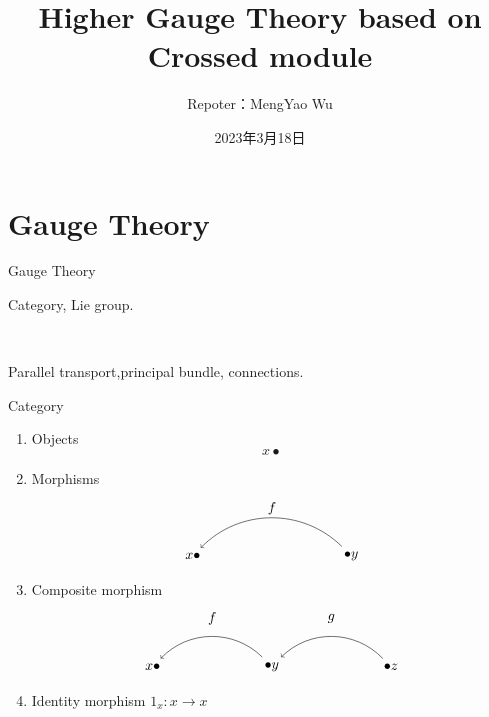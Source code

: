 \documentclass[12pt,aspectratio=53,mathserif]{beamer}
\title[Higher Gauge Theory based on Crossed module ]   %
       {\textbf{Higher Gauge Theory based on Crossed module} }   %
\author[Capital Normal University]    %
       {Repoter：MengYao Wu
       	\\[3mm]}
\date[2023年3月18日]{2023年3月18日}
\begin{document}
\begin{frame}
\titlepage
\end{frame}				%



	
%	
%	

	\section{Gauge Theory}
	
        
    
	\begin{frame}{Gauge Theory}
		\begin{itemize}
            \begin{spacing}{2.0}
			\item 
			Category, Lie group.
			
			\ 
			\item 
			 Parallel transport,principal bundle, connections.
		\end{spacing}
    	\end{itemize} 
  	\end{frame}

\begin{frame}{Category}
    	\begin{enumerate} 
        \item Objects
        $$x \bullet$$
        \item Morphisms
        $$\begin{tikzpicture}
            \node[black](a)at(0, 0){$x \bullet$};
            \node[black](b)at(4, 0){$\bullet y $};
            \draw[<-](a)to [bend left=45](b);
            \node[black](c)at(2, 1.2){$f$};
        \end{tikzpicture}$$
        \item Composite morphism
    $$\begin{tikzpicture}
        \node[black](a)at(0, 0){$x \bullet $};
        \node[black](b)at(3, 0){$\bullet y $};
        \node[black](c)at(6, 0){$\bullet z $};
        \draw[<-](a)to [bend left=45](b);
        \draw[<-](b)to [bend left=45](c);
        \node[black](d)at(1.5, 1.2){$f$};
        \node[black](e)at(4.5, 1.2){$g$};
    \end{tikzpicture}$$
 \item Identity morphism $1_x:x\rightarrow x$ 
    \end{enumerate}
  \end{frame}
	
\end{document}
